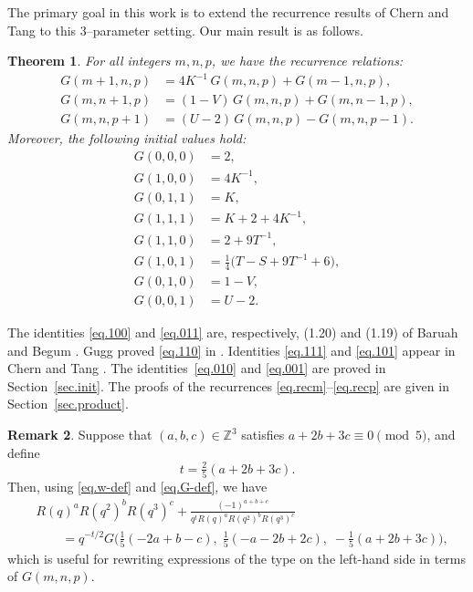 \documentclass{amsart}
\newtheorem{theorem}{Theorem}[section]
\theoremstyle{definition}
\newtheorem{remark}[theorem]{Remark}
\begin{document}
{The primary goal in this work is to extend the recurrence results of Chern and Tang to this 3--parameter setting.  Our}
main result is as follows.

\begin{theorem}\label{thm.main}
For all integers $m,n,p$, we have the recurrence relations:
\begin{align}
G(m+1,n,p) &= 4K^{-1}\,G(m,n,p) + G(m-1,n,p), \label{eq.recm}\\
G(m,n+1,p) &= (1-V)\,G(m,n,p) + G(m,n-1,p), \label{eq.recn}\\
G(m,n,p+1) &= (U-2)\,G(m,n,p) - G(m,n,p-1). \label{eq.recp}
\end{align}
Moreover, the following initial values hold:
\begin{align}
G(0,0,0) &= 2,\label{eq.000}\\
G(1,0,0) &= 4K^{-1},\label{eq.100}\\
G(0,1,1) &= K,\label{eq.011}\\
G(1,1,1) &= K + 2 + 4K^{-1},\label{eq.111}\\
G(1,1,0) &= 2 + 9T^{-1},\label{eq.110}\\
G(1,0,1) &= \tfrac14\bigl(T - S + 9T^{-1} + 6\bigr), \label{eq.101}\\
G(0,1,0) &= 1 - V,\label{eq.010}\\
G(0,0,1) &= U - 2.\label{eq.001}
\end{align}
\end{theorem}

The identities \eqref{eq.100} and \eqref{eq.011} are, respectively,
(1.20) and (1.19) of Baruah and Begum
\cite[Lemma~1.3]{Baruah-Begum}. Gugg proved \eqref{eq.110} in
\cite[Theorem~5.1(iv)]{Gugg2012}. Identities \eqref{eq.111} and \eqref{eq.101} appear in
Chern and Tang \cite[Table~1 and (1.14)]{CT2021}. The identities~\eqref{eq.010} and
\eqref{eq.001} are proved in Section~\ref{sec.init}. The proofs of the recurrences \eqref{eq.recm}--\eqref{eq.recp}  are given in
Section~\ref{sec.product}.

\begin{remark}
Suppose that $(a,b,c)\in\mathbb{Z}^{3}$ satisfies
$a+2b+3c\equiv0\pmod5$, and define
\begin{equation*}
t=\tfrac25(a+2b+3c).
\end{equation*}
Then, using \eqref{eq.w-def} and \eqref{eq.G-def}, we have
\begin{equation*}
\begin{aligned}
&R(q)^{a}R(q^{2})^{b}R(q^{3})^{c}
+
\frac{(-1)^{a+b+c}}
{q^{t}R(q)^{a}R(q^{2})^{b}R(q^{3})^{c}}\\
&\qquad
=q^{-t/2}G\bigl(
\tfrac15(-2a+b-c),\;
\tfrac15(-a-2b+2c),\;
-\tfrac15(a+2b+3c)
\bigr),
\end{aligned}
\end{equation*}
which is useful for rewriting expressions of the type on the left-hand side in
terms of $G(m,n,p)$.
\end{remark}
\end{document}
